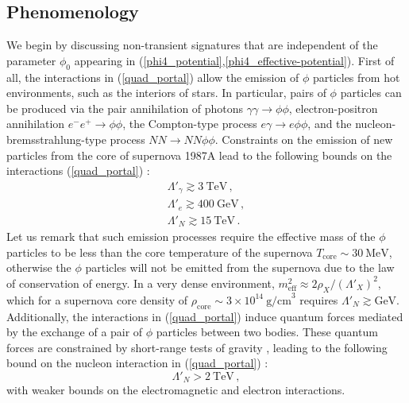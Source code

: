 \documentclass[aps,prd,onecolumn,nofootinbib]{revtex4-2} %
\begin{document}
\subsection{Phenomenology}
\label{Sec:Main_Phenomenology}
We begin by discussing non-transient signatures that are independent of the parameter $\phi_0$ appearing in (\ref{phi4_potential},\ref{phi4_effective-potential}). 
First of all, the interactions in (\ref{quad_portal}) allow the emission of $\phi$ particles from hot environments, such as the interiors of stars. 
In particular, pairs of $\phi$ particles can be produced via the pair annihilation of photons $\gamma \gamma \to \phi \phi$, electron-positron annihilation $e^- e^+ \to \phi \phi$, the Compton-type process $e \gamma \to e \phi \phi$, and the nucleon-bremsstrahlung-type process $N N \to N N \phi \phi$. 
Constraints on the emission of new particles from the core of supernova 1987A lead to the following bounds on the interactions (\ref{quad_portal}) \cite{Olive-Pospelov_2008-FCs+symmetron}: 
\begin{gather}
\Lambda'_\gamma \gtrsim 3~\textrm{TeV}  \, ,  \label{SNe_bound-photon} \\ 
\Lambda'_e \gtrsim 400~\textrm{GeV}  \, ,  \label{SNe_bound-electron} \\ 
\Lambda'_N \gtrsim 15~\textrm{TeV}  \, .  \label{SNe_bound-nucleon} 
\end{gather}
Let us remark that such emission processes require the effective mass of the $\phi$ particles to be less than the core temperature of the supernova $T_\textrm{core} \sim 30~\textrm{MeV}$, otherwise the $\phi$ particles will not be emitted from the supernova due to the law of conservation of energy. 
In a very dense environment, $m_\textrm{eff}^2 \approx 2 \rho_X / (\Lambda'_X)^2$, which for a supernova core density of $\rho_\textrm{core} \sim 3 \times 10^{14}~\textrm{g/cm}^3$ requires $\Lambda'_N \gtrsim \textrm{GeV}$. 
Additionally, the interactions in (\ref{quad_portal}) induce quantum forces mediated by the exchange of a pair of $\phi$ particles between two bodies. 
These quantum forces are constrained by short-range tests of gravity \cite{Adelberger2007Short-range_gravity-A,Adelberger2007Short-range_gravity-B}, leading to the following bound on the nucleon interaction in (\ref{quad_portal}) \cite{Olive-Pospelov_2008-FCs+symmetron,Brax-Fichet_2019-symmetron}: 
\begin{equation}
\label{quantum_forces_bound-nucleon}
\Lambda'_N > 2~\textrm{TeV}  \, , 
\end{equation}
with weaker bounds on the electromagnetic and electron interactions. 
\end{document}

